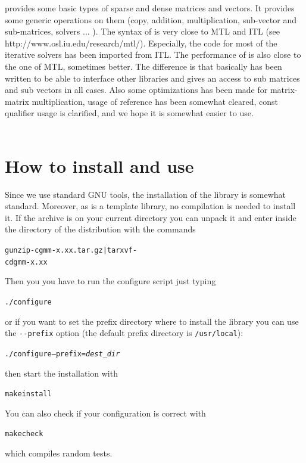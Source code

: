 \documentclass[11pt,a4paper]{article}
\begin{document}
\gmm provides some basic types of sparse and dense matrices and vectors. It provides some generic operations on them (copy, addition, multiplication, sub-vector and sub-matrices, solvers ... ). The syntax of \gmm is very close to MTL and ITL (see http://www.osl.iu.edu/research/mtl/). Especially, the code for most of the iterative solvers has been imported from ITL. The performance of \gmm is also close to the one of MTL, sometimes better. The difference is that basically \gmm has been written to be able to interface other libraries and gives an access to sub matrices and sub vectors in all cases. Also some optimizations has been made for matrix-matrix multiplication, usage of reference has been somewhat cleared, const qualifier usage is clarified, and we hope it is somewhat easier to use.\\ \\[3cm]
\htmlonly{\\\\\\}


\newpage
\tableofcontents
\newpage

\section{How to install and use \gmm}
Since we use standard GNU tools, the installation of the \gmm library is somewhat standard. Moreover, as \gmm is a template library, no compilation is needed to install it. If the \gmm  archive is on your current directory you can unpack it and enter inside the directory of the distribution  with the commands
\begin{alltt}
  gunzip -c gmm-x.xx.tar.gz | tar xvf -
  cd  gmm-x.xx
\end{alltt}
Then you you have to run the configure script just typing
\begin{alltt}
  ./configure
\end{alltt}
or if you want to set the prefix directory where to install the library you can use the {\tt {-}{-}prefix} option (the default prefix directory is {\tt /usr/local}):
\begin{alltt}
  ./configure --prefix=\textit{dest_dir}
\end{alltt}
then start the installation with
\begin{alltt}
  make install
\end{alltt}
You can also check if your configuration is correct with
\begin{alltt}
  make check
\end{alltt}
which compiles random tests.
\end{document}
